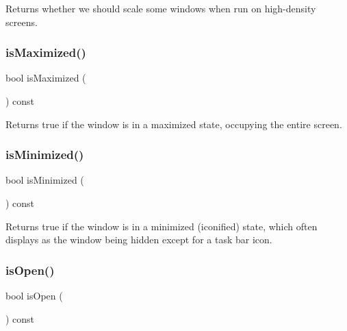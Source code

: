 Returns whether we should scale some windows when run on high-\/density screens. 

\mbox{\label{classGWindow_a28e910de88f3ff5419710b0b0a03c2bb}} 
\subsubsection{\texorpdfstring{is\+Maximized()}{isMaximized()}}
{\footnotesize\ttfamily bool is\+Maximized (\begin{DoxyParamCaption}{ }\end{DoxyParamCaption}) const\hspace{0.3cm}{\ttfamily [virtual]}}



Returns true if the window is in a maximized state, occupying the entire screen. 

\mbox{\label{classGWindow_a14e6f95fa2c9ec543caa7f16f30c53d6}} 
\subsubsection{\texorpdfstring{is\+Minimized()}{isMinimized()}}
{\footnotesize\ttfamily bool is\+Minimized (\begin{DoxyParamCaption}{ }\end{DoxyParamCaption}) const\hspace{0.3cm}{\ttfamily [virtual]}}



Returns true if the window is in a minimized (iconified) state, which often displays as the window being hidden except for a task bar icon. 

\mbox{\label{classGWindow_a002ed331862370f434b7befe331b5a0b}} 
\subsubsection{\texorpdfstring{is\+Open()}{isOpen()}}
{\footnotesize\ttfamily bool is\+Open (\begin{DoxyParamCaption}{ }\end{DoxyParamCaption}) const\hspace{0.3cm}{\ttfamily [virtual]}}



